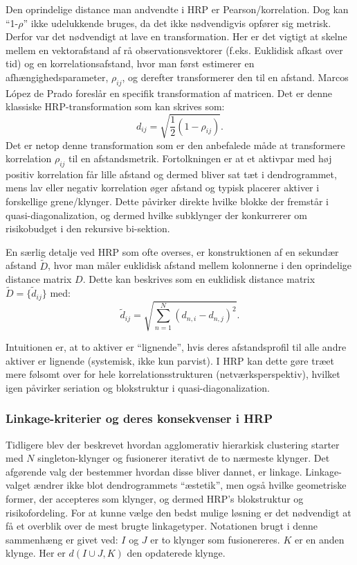 \documentclass[../main.tex]{subfiles}
\begin{document}
Den oprindelige distance man andvendte i HRP er Pearson/korrelation. Dog kan ``1-$\rho$'' ikke udelukkende bruges, da det ikke nødvendigvis opfører sig metrisk. Derfor var det nødvendigt at lave en transformation. Her er det vigtigt at skelne mellem en vektorafstand af rå observationsvektorer (f.eks. Euklidisk afkast over tid) og en korrelationsafstand, hvor man først estimerer en afhængighedsparameter, $\rho_{ij}$, og derefter transformerer den til en afstand. Marcos López de Prado foreslår en specifik transformation af matricen. Det er denne klassiske HRP-transformation som kan skrives som:
\[
    d_{ij}=\sqrt{\frac{1}{2}(1-\rho_{ij})}.
\]
Det er netop denne transformation som er den anbefalede måde at transformere korrelation $\rho_{ij}$ til en afstandsmetrik. Fortolkningen er at et aktivpar med høj positiv korrelation får lille afstand og dermed bliver sat tæt i dendrogrammet, mens lav eller negativ korrelation øger afstand og typisk placerer aktiver i forskellige grene/klynger. Dette påvirker direkte hvilke blokke der fremstår i quasi-diagonalization, og dermed hvilke subklynger der konkurrerer om risikobudget i den rekursive bi-sektion.~\cite{mantegna_hierarchical_1999,lopez_de_prado_building_2016,kaae_karppinen_hierarchical_2022}

En særlig detalje ved HRP som ofte overses, er konstruktionen af en sekundær afstand $\tilde{D}$, hvor man måler euklidisk afstand mellem kolonnerne i den oprindelige distance matrix $D$. Dette kan beskrives som en euklidisk distance matrix $\tilde{D}=\{\tilde{d}_{ij}\}$ med:~\cite{kaae_karppinen_hierarchical_2022}
\[
    \tilde{d}_{ij}=\sqrt{\sum_{n=1}^{N}(d_{n,i}-d_{n,j})^2}.
\]

Intuitionen er, at to aktiver er ``lignende'', hvis deres afstandsprofil til alle andre aktiver er lignende (systemisk, ikke kun parvist). I HRP kan dette gøre træet mere følsomt over for hele korrelationsstrukturen (netværksperspektiv), hvilket igen påvirker seriation og blokstruktur i quasi-diagonalization.~\cite{kaae_karppinen_hierarchical_2022}

\subsubsection{Linkage-kriterier og deres konsekvenser i HRP}

Tidligere blev der beskrevet hvordan agglomerativ hierarkisk clustering starter med $N$ singleton-klynger og fusionerer iterativt de to nærmeste klynger. Det afgørende valg der bestemmer hvordan disse bliver dannet, er linkage. Linkage-valget ændrer ikke blot dendrogrammets ``æstetik'', men også hvilke geometriske former, der accepteres som klynger, og dermed HRP's blokstruktur og risikofordeling. For at kunne vælge den bedst mulige løsning er det nødvendigt at få et overblik over de mest brugte linkagetyper. Notationen brugt i denne sammenhæng er givet ved: $I$ og $J$ er to klynger som fusionereres. $K$ er en anden klynge. Her er $d(I \cup J,K)$ den opdaterede klynge.
\end{document}
